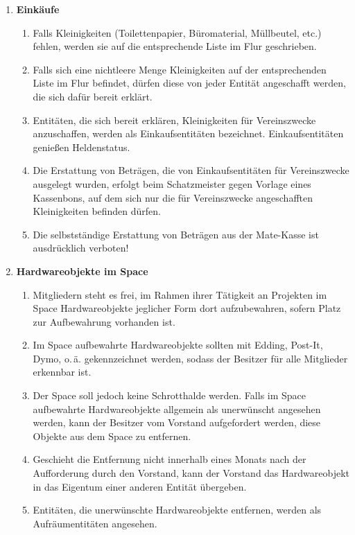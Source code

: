 \documentclass[12pt,a4paper]{scrartcl}
\begin{document}
\begin{enumerate}
  \item\textbf{Einkäufe}\begin{enumerate}
    \item Falls Kleinigkeiten (Toilettenpapier, Büromaterial, Müllbeutel, etc.)
      fehlen, werden sie auf die entsprechende Liste im Flur geschrieben.
    \item Falls sich eine nichtleere Menge Kleinigkeiten auf der entsprechenden
      Liste im Flur befindet, dürfen diese von jeder Entität angeschafft werden,
      die sich dafür bereit erklärt.
    \item Entitäten, die sich bereit erklären, Kleinigkeiten für Vereinszwecke
      anzuschaffen, werden als Einkaufsentitäten bezeichnet. Einkaufsentitäten
      genießen Heldenstatus.
    \item Die Erstattung von Beträgen, die von Einkaufsentitäten für
      Vereinszwecke ausgelegt wurden, erfolgt beim Schatzmeister gegen Vorlage
      eines Kassenbons, auf dem sich nur die für Vereinszwecke angeschafften
      Kleinigkeiten befinden dürfen.
    \item Die selbstständige Erstattung von Beträgen aus der Mate-Kasse ist
      ausdrücklich verboten!
  \end{enumerate}

  \item\textbf{Hardwareobjekte im Space}\begin{enumerate}
    \item Mitgliedern steht es frei, im Rahmen ihrer Tätigkeit an Projekten im
      Space Hardwareobjekte jeglicher Form dort aufzubewahren, sofern Platz zur
      Aufbewahrung vorhanden ist.
    \item Im Space aufbewahrte Hardwareobjekte sollten mit Edding,
      Post-It, Dymo, o.\,ä. gekennzeichnet werden, sodass der Besitzer für alle
      Mitglieder erkennbar ist.
    \item Der Space soll jedoch keine Schrotthalde werden. Falls im Space
      aufbewahrte Hardwareobjekte allgemein als unerwünscht angesehen werden,
      kann der Besitzer vom Vorstand aufgefordert werden, diese Objekte aus dem
      Space zu entfernen.
    \item Geschieht die Entfernung nicht innerhalb eines Monats nach der
      Aufforderung durch den Vorstand, kann der Vorstand das Hardwareobjekt in
      das Eigentum einer anderen Entität übergeben.
    \item Entitäten, die unerwünschte Hardwareobjekte entfernen, werden als
      Aufräumentitäten angesehen.
  \end{enumerate}


\end{enumerate}
\end{document}
